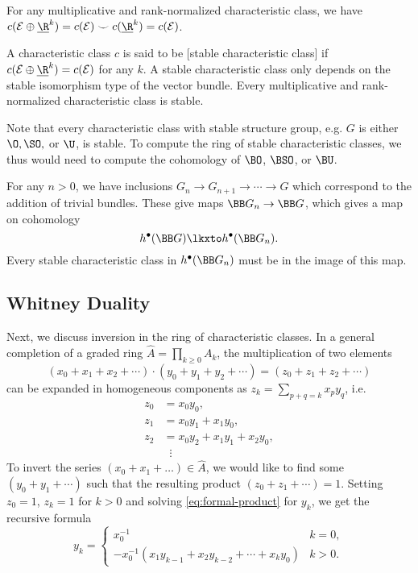 \begin{corollary}
	For any multiplicative and rank-normalized characteristic class, we have $c(\mathcal{E}\oplus \underline{\R}^k)=c(\mathcal{E})\smile c(\underline{\R}^k)= c(\mathcal{E})$.
\end{corollary}

\begin{definition}
	A characteristic class $c$ is said to be [stable characteristic class] if $c(\mathcal{E}\oplus \underline{\R}^k) = c(\mathcal{E})$ for any $k$. A stable characteristic class only depends on the stable isomorphism type of the vector bundle. Every multiplicative and rank-normalized characteristic class is stable.
\end{definition}

\begin{remark}
	Note that every characteristic class with stable structure group, e.g. $G$ is either $\O, \SO,$ or $\U$, is stable. To compute the ring of stable characteristic classes, we thus would need to compute the cohomology of $\BO$, $\BSO$, or $\BU$.

	For any $n>0$, we have inclusions $G_n \to G_{n+1} \to \cdots \to G$ which correspond to the addition of trivial bundles. These give maps $\BB G_n \to \BB G$, which gives a map on cohomology
	\[
		h^\bullet(\BB G) \lkxto h^\bullet(\BB G_n).
	\]
	Every stable characteristic class in $h^\bullet(\BB G_n)$ must be in the image of this map.
\end{remark}

\subsection{Whitney Duality}

Next, we discuss inversion in the ring of characteristic classes.
In a general completion of a graded ring $\widehat{A}=\prod_{k\geq 0}A_k$, the multiplication of two elements
\[
	(x_0+x_1+x_2+\cdots)\cdot (y_0+y_1+y_2+\cdots) = (z_0 + z_1 + z_2+\cdots)
\]
can be expanded in homogeneous components as $z_k=\sum_{p+q=k} x_py_q$, i.e.
\begin{equation}\label{eq:formal-product}
	\begin{aligned}
		z_0 & = x_0y_0,                 \\
		z_1 & = x_0y_1 + x_1y_0,        \\
		z_2 & = x_0y_2 + x_1y_1+x_2y_0, \\
		    & \;\;\vdots
	\end{aligned}
\end{equation}
To invert the series $(x_0+ x_1+\ldots)\in \widehat{A}$, we would like to find some $(y_0+y_1+\cdots)$ such that the resulting product $(z_0+z_1+\cdots)=1$. Setting $z_0=1$, $z_k=1$ for $k>0$ and solving \cref{eq:formal-product} for $y_k$, we get the recursive formula
\begin{equation}\label{eq:formal-inversion}
	y_k = \begin{cases}x_0^{-1}                                        & k=0,   \\
             -x_0^{-1}(x_1y_{k-1}+x_2y_{k-2}+\cdots +x_ky_0) & k > 0.
	\end{cases}
\end{equation}

